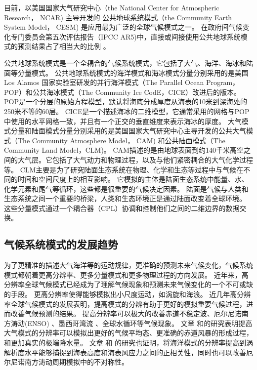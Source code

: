  
目前，以美国国家大气研究中心（the National Center for Atmospheric Research， NCAR) 主导开发的
公共地球系统模式（the Community Earth System Model， CESM) 是应用最为广泛的全球气候模式之一\cite{hurrell2013community}。
在政府间气候变化专门委员会第五次评估报告（IPCC AR5)中，直接或间接使用公共地球系统模式的预测结果占了相当大的比例 \cite{stocker2013ipcc}。
 

公共地球系统模式是一个全耦合的气候系统模式，它包括了大气、海洋、海冰和陆面等分量模式。
公共地球系统模式的海洋模式和海冰模式分量分别采用的是美国Los Alamos 国家实验室研发的并行海洋模式（The Parallel Ocean Program，POP）和公共海冰模式（The Community Ice CodE，CICE）改进后的版本。
POP是一个分层的原始方程模型，默认将海底分成厚度从海表的10米到深海处的250米不等的60层。
CICE是一个描述海冰的二维模型，它通常采用的网格与POP中使用的水平网格一致，并且有一个正交的垂直维度来表示海冰的厚度。 
大气模式分量和陆面模式分量分别采用的是美国国家大气研究中心主导开发的公共大气模式（The Community Atmosphere Model， CAM) 和公共陆面模式（The Community Land Model，CLM)。 
CAM描述的是由地球表面到约140千米高空之间的大气层。它包括了大气动力和物理过程，以及与他们紧密耦合的大气化学过程等。
CLM主要是为了研究陆面生态系统在物理、化学和生态等过程中与气候在不同的时间和空间尺度上的相互影响。
它模拟的主体是陆面生态系统中能量、水、化学元素和尾气等循环，这些都是很重要的气候决定因素。
陆面是气候与人类和生态系统之间一个重要的桥梁，人类和生态环境正是通过陆面改变着全球环境。
这些分量模式通过一个耦合器（CPL）协调和控制他们之间的二维边界的数据交换。

 

\subsection{气候系统模式的发展趋势}

为了更精准的描述大气海洋等的运动规律，更准确的预测未来气候变化，气候系统模式都朝着更高分辨率、更多分量模式和更多物理过程的方向发展。
近年来，高分辨率全球气候模式已经成为了理解气候现象和预测未来气候变化的一个不可或缺的手段。
更高分辨率使得能够模拟出小尺度运动，如涡旋和海浪。 
近几年高分辨率全球气候模式的发展表明，提高模式的分辨有助于更好的模拟重要气候过程，进而改善气候预测的结果。
提高分辨率可以极大的改善赤道不稳定波\citep{roberts2009impact}、厄尔尼诺南方涛动(ENSO) \citep{shaffrey2009uk}、墨西哥湾流\citep{chassignet2008gulf, kuwano2010precipitation} 、全球水循环\citep{demory2014role}等气候现象。
文章 和的研究表明提高大气模式的分辨率可以模拟出更好的气候平均态、更准确的赤道风暴的形成过程，和更加真实的极端降水量。
文章 和 的研究也证明，将海洋模式的分辨率提高到涡解析度水平能够捕捉到海表高度和海表风应力之间的正相关性，同时也可以改善厄尔尼诺南方涛动周期模拟中的不对称性。



